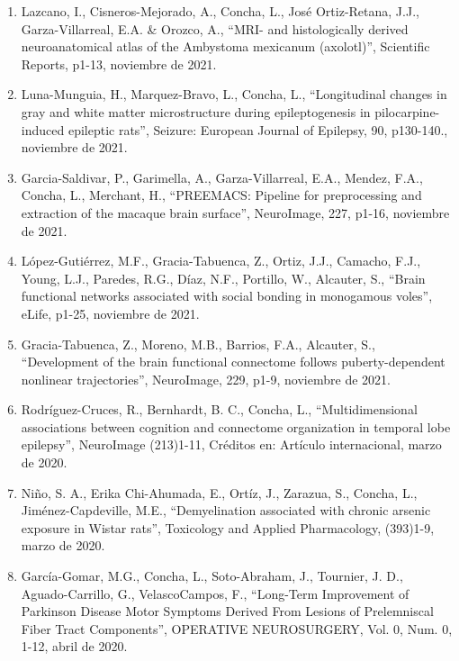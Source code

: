\begin{enumerate}
\item Lazcano, I., Cisneros-Mejorado, A., Concha, L., José Ortiz-Retana, J.J., Garza-Villarreal, E.A. \& Orozco, A., “MRI- 
and histologically derived neuroanatomical atlas of the Ambystoma mexicanum (axolotl)”, Scientific Reports, p1-13, noviembre de 2021.

\item Luna-Munguia, H., Marquez-Bravo, L., Concha, L., “Longitudinal changes in gray and white matter microstructure during 
epileptogenesis in pilocarpine-induced epileptic rats”, Seizure: European Journal of Epilepsy, 90, p130-140., noviembre de 2021.

\item Garcia-Saldivar, P., Garimella, A., Garza-Villarreal, E.A., Mendez, F.A., Concha, L., Merchant, H., “PREEMACS: 
Pipeline 
for preprocessing and extraction of the macaque brain surface”, NeuroImage, 227, p1-16, noviembre de 2021.

\item López-Gutiérrez, M.F., Gracia-Tabuenca, Z., Ortiz, J.J., Camacho, F.J., Young, L.J., Paredes, R.G., Díaz, N.F., 
Portillo, W., Alcauter, S., “Brain functional networks associated with social bonding in monogamous voles”, eLife, p1-25, noviembre de 2021.

\item Gracia-Tabuenca, Z., Moreno, M.B., Barrios, F.A., Alcauter, S., “Development of the brain functional connectome 
follows 
puberty-dependent nonlinear trajectories”, NeuroImage, 229, p1-9, noviembre de 2021.

\item Rodríguez-Cruces, R., Bernhardt, B. C., Concha, L., “Multidimensional associations between cognition and connectome 
organization in temporal lobe epilepsy”, NeuroImage (213)1-11, Créditos en: Artículo internacional, marzo de 2020.

\item Niño, S. A., Erika Chi-Ahumada, E., Ortíz, J., Zarazua, S., Concha, L., Jiménez-Capdeville, M.E., “Demyelination associated with chronic arsenic exposure in Wistar rats”, Toxicology and Applied 
Pharmacology, (393)1-9, marzo de 2020.

\item García-Gomar, M.G., Concha, L., Soto-Abraham, J., Tournier, J. D., Aguado-Carrillo, G., VelascoCampos, F., “Long-Term 
Improvement of Parkinson Disease Motor Symptoms Derived From Lesions of Prelemniscal Fiber Tract Components”, OPERATIVE 
NEUROSURGERY, Vol. 0, Num. 0, 1-12, abril de 2020.


\end{enumerate}
